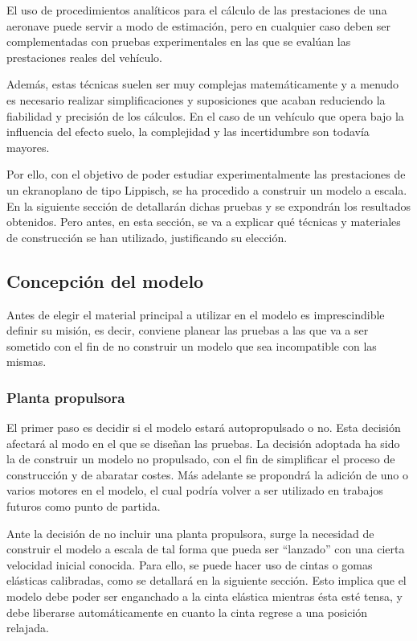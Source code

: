 El uso de procedimientos analíticos para el cálculo de las prestaciones de una aeronave puede servir a modo de estimación, pero en cualquier caso deben ser complementadas con pruebas experimentales en las que se evalúan las prestaciones reales del vehículo.

Además, estas técnicas suelen ser muy complejas matemáticamente y a menudo es necesario realizar simplificaciones y suposiciones que acaban reduciendo la fiabilidad y precisión de los cálculos. En el caso de un vehículo que opera bajo la influencia del efecto suelo, la complejidad y las incertidumbre son todavía mayores.

Por ello, con el objetivo de poder estudiar experimentalmente las prestaciones de un ekranoplano de tipo Lippisch, se ha procedido a construir un modelo a escala. En la siguiente sección de detallarán dichas pruebas y se expondrán los resultados obtenidos. Pero antes, en esta sección, se va a explicar qué técnicas y materiales de construcción se han utilizado, justificando su elección.


\subsection{Concepción del modelo}
\label{sec:building:conception}

Antes de elegir el material principal a utilizar en el modelo es imprescindible definir su misión, es decir, conviene planear las pruebas a las que va a ser sometido con el fin de no construir un modelo que sea incompatible con las mismas.

\subsubsection{Planta propulsora}
\label{sec:building:conception:propulsion}

El primer paso es decidir si el modelo estará autopropulsado o no. Esta decisión afectará al modo en el que se diseñan las pruebas. La decisión adoptada ha sido la de construir un modelo no propulsado, con el fin de simplificar el proceso de construcción y de abaratar costes. Más adelante se propondrá la adición de uno o varios motores en el modelo, el cual podría volver a ser utilizado en trabajos futuros como punto de partida.

Ante la decisión de no incluir una planta propulsora, surge la necesidad de construir el modelo a escala de tal forma que pueda ser “lanzado” con una cierta velocidad inicial conocida. Para ello, se puede hacer uso de cintas o gomas elásticas calibradas, como se detallará en la siguiente sección. Esto implica que el modelo debe poder ser enganchado a la cinta elástica mientras ésta esté tensa, y debe liberarse automáticamente en cuanto la cinta regrese a una posición relajada.

